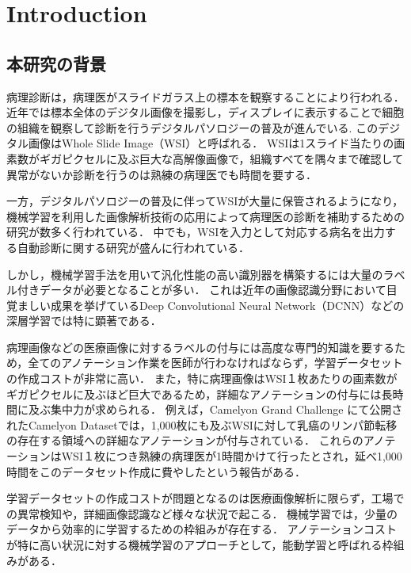 \section{Introduction}
\subsection{本研究の背景}

病理診断は，病理医がスライドガラス上の標本を観察することにより行われる．
近年では標本全体のデジタル画像を撮影し，ディスプレイに表示することで細胞の組織を観察して診断を行うデジタルパソロジーの普及が進んでいる\cite{pantanowitz2010digital}.
このデジタル画像はWhole Slide Image（WSI）と呼ばれる．
WSIは1スライド当たりの画素数がギガピクセルに及ぶ巨大な高解像画像で，組織すべてを隅々まで確認して異常がないか診断を行うのは熟練の病理医でも時間を要する．

一方，デジタルパソロジーの普及に伴ってWSIが大量に保管されるようになり，機械学習を利用した画像解析技術の応用によって病理医の診断を補助するための研究が数多く行われている\cite{gurcan2009histopathological, komuraishikawa, litjens2017survey}．
中でも，WSIを入力として対応する病名を出力する自動診断に関する研究が盛んに行われている\cite{doyle2008automated,dundar2011computerized}．

しかし，機械学習手法を用いて汎化性能の高い識別器を構築するには大量のラベル付きデータが必要となることが多い．
これは近年の画像認識分野において目覚ましい成果を挙げているDeep Convolutional Neural Network（DCNN）などの深層学習では特に顕著である．

病理画像などの医療画像に対するラベルの付与には高度な専門的知識を要するため，全てのアノテーション作業を医師が行わなければならず，学習データセットの作成コストが非常に高い．
また，特に病理画像はWSI１枚あたりの画素数がギガピクセルに及ぶほど巨大であるため，詳細なアノテーションの付与には長時間に及ぶ集中力が求められる．
例えば，Camelyon Grand Challenge \cite{Camelyon17}にて公開されたCamelyon Datasetでは，1,000枚にも及ぶWSIに対して乳癌のリンパ節転移の存在する領域への詳細なアノテーションが付与されている．
これらのアノテーションはWSI１枚につき熟練の病理医が1時間かけて行ったとされ，延べ1,000時間をこのデータセット作成に費やしたという報告がある．

学習データセットの作成コストが問題となるのは医療画像解析に限らず，工場での異常検知や，詳細画像認識など様々な状況で起こる．
機械学習では，少量のデータから効率的に学習するための枠組みが存在する．
アノテーションコストが特に高い状況に対する機械学習のアプローチとして，能動学習\cite{settles2010active}と呼ばれる枠組みがある．

